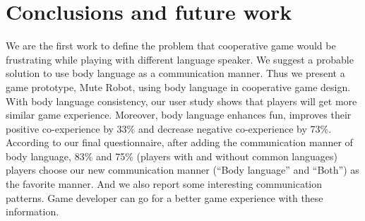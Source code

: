 \section{Conclusions and future work}




We are the first work to define the problem that cooperative game would be frustrating while playing with different language speaker. We suggest a probable solution to use body language as a communication manner. Thus we present a game prototype, Mute Robot, using body language in cooperative game design. With body language consistency, our user study shows that players will get more similar game experience. Moreover, body language enhances fun, improves their positive co-experience by 33\% and decrease negative co-experience by 73\%. According to our final questionnaire, 
after adding the communication manner of body language, 83\% and 75\% (players with and without common languages) players choose our new communication manner (``Body language'' and ``Both'') as the favorite manner. 
And we also report some interesting communication patterns. Game developer can go for a better game experience with these information.

